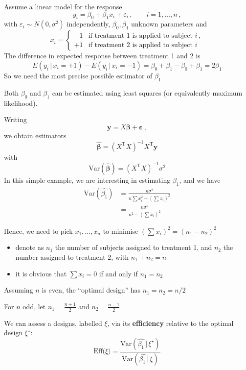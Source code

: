\documentclass[
  ignorenonframetext,
]{beamer}
\providecommand{\tightlist}{%
  \setlength{\itemsep}{0pt}\setlength{\parskip}{0pt}}
\begin{document}
\begin{frame}{}
\protect\hypertarget{section}{}
Assume a linear model for the response \[
y_i = \beta_0 + \beta_1 x_i + \varepsilon_i\,,\qquad i=1,\ldots,n\,,
\] with \(\varepsilon_i\sim N(0, \sigma^2)\) independently,
\(\beta_0,\beta_1\) unknown parameters and \[
x_i = \left\{
\begin{array}{cc}
-1 & \mbox{if treatment 1 is applied to subject $i$}\,, \\
+1 & \mbox{if treatment 2 is applied to subject $i$}
\end{array}
\right.
\] The difference in expected response between treatment 1 and 2 is \[
E(y_i\,|\, x_i = +1) - E(y_i\,|\, x_i = -1) = \beta_0 + \beta_1 - \beta_0 + \beta_1 = 2\beta_1 
\] So we need the most precise possible estimator of \(\beta_1\)
\end{frame}

\begin{frame}{}
\protect\hypertarget{section-1}{}
Both \(\beta_0\) and \(\beta_1\) can be estimated using least squares
(or equivalently maximum likelihood).

Writing \[
\boldsymbol{y}= X\boldsymbol{\beta}+ \boldsymbol{\varepsilon}\,,
\] we obtain estimators \[
\hat{\boldsymbol{\beta}} = \left(X^\mathrm{T}X\right)^{-1}X^\mathrm{T}\boldsymbol{y}
\] with \[
\mbox{Var}(\hat{\boldsymbol{\beta}}) = \left(X^\mathrm{T}X\right)^{-1}\sigma^2
\] In this simple example, we are interesting in estimating \(\beta_1\),
and we have \[
\begin{split}
\mbox{Var}(\hat{\beta_1}) & = \frac{n\sigma^2}{n\sum x_i^2 - \left(\sum x_i\right)^2}\\ 
& = \frac{n\sigma^2}{n^2 - \left(\sum x_i\right)^2}
\end{split}
\]
\end{frame}

\begin{frame}{}
\protect\hypertarget{section-2}{}
Hence, we need to pick \(x_1,\ldots,x_n\) to minimise
\(\left(\sum x_i\right)^2 = (n_1 - n_2)^2\)

\begin{itemize}
\tightlist
\item
  denote as \(n_1\) the number of subjects assigned to treatment 1, and
  \(n_2\) the number assigned to treatment 2, with \(n_1+n_2 = n\)
\item
  it is obvious that \(\sum x_i = 0\) if and only if \(n_1 = n_2\)
\end{itemize}

Assuming \(n\) is even, the ``optimal design'' has \(n_1 = n_2 = n/2\)

For \(n\) odd, let \(n_1 = \frac{n+1}{2}\) and \(n_2 = \frac{n-1}{2}\)

We can assess a designs, labelled \(\xi\), via its \textbf{efficiency}
relative to the optimal design \(\xi^\star\): \[
\mbox{Eff($\xi$)} = \frac{\mbox{Var}(\hat{\beta_1}\,|\,\xi^\star)}{\mbox{Var}(\hat{\beta_1}\,|\,\xi)}
\]
\end{frame}
\end{document}
